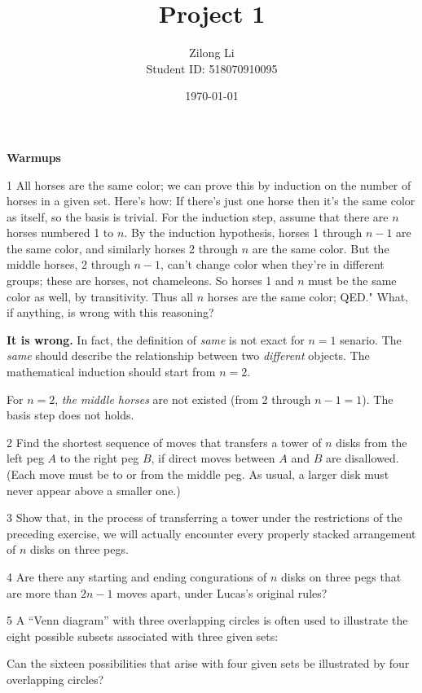 \documentclass[a4paper,12pt]{article}
\title{Project 1}
\author{Zilong Li\\\small Student ID: 518070910095}
\date{\today}
\makeatletter
\newtheorem*{solution}{Solution}
\theoremstyle{definition}
\renewenvironment{solution}[1][Solution] {\par\pushQED{\qed}\normalfont\topsep6\p@\@plus6\p@\relax\trivlist\item[\hskip\labelsep\bfseries#1\@addpunct{.}]\ignorespaces}{\popQED\endtrivlist\@endpefalse} \makeatother
\newenvironment{problems}{\begin{list}{}{\renewcommand{\makelabel}[1]{\textbf{##1}\hfil}}}{\end{list}}
\makeatother
\begin{document}
\maketitle

\noindent\textbf{Warmups}

\begin{problems}
    \item[1] All horses are the same color; we can prove this by induction on the number of horses in a given set. Here's how: If there's just one horse then it's the same color as itself, so the basis is trivial. 
    For the induction step, assume that there are $n$ horses numbered 1 to $n$. By the induction hypothesis, horses 1 through $n - 1$ are the same color, and similarly horses 2 through $n$ are the same color. 
    But the middle horses, 2 through $n - 1$, can't change color when they're in different groups; these are horses, not chameleons. 
    So horses 1 and $n$ must be the same color as well, by transitivity. Thus all $n$ horses are the same color; QED." What, if anything, is wrong with this reasoning?
    \begin{solution}
        \textbf{It is wrong.} In fact, the definition of \emph{same} is not exact for $n=1$ senario. The \emph{same} should describe the relationship between two \emph{different} objects. The mathematical induction should start from $n=2$.

        For $n=2$, \emph{the middle horses} are not existed (from 2 through $n-1=1$). The basis step does not holds.
    \end{solution}

    \item[2] Find  the  shortest  sequence  of  moves  that  transfers  a  tower  of $n$ disks from the left peg $A$ to the right peg $B$, if direct moves between $A$ and $B$ are disallowed. (Each move must be to or from the middle peg. As usual, a larger disk must never appear above a smaller one.)
    
    \item[3] Show that, in the process of transferring a tower under the restrictions of the preceding exercise, we will actually encounter every properly stacked arrangement of $n$ disks on three pegs.
    
    \item[4] Are there any starting and ending congurations of $n$ disks on three pegs that are more than $2n-1$ moves apart, under Lucas's original rules?
    
    \item[5] A ``Venn diagram'' with three overlapping circles is often used to illustrate the eight possible subsets associated with three given sets:
    
    

    Can the sixteen possibilities that arise with four given sets be illustrated by four overlapping circles?
\end{problems}
\end{document}
